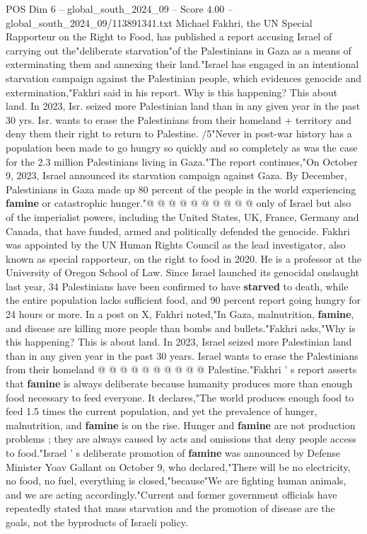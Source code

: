 \begin{textsample}{POS Dim 6 – global\_south\_2024\_09 – Score 4.00 – global\_south\_2024\_09/113891341.txt}  \label{ex:f6_pos_437}
Michael Fakhri, the UN Special Rapporteur on the Right to Food, has published a report accusing Israel of carrying out the"deliberate starvation"of the Palestinians in Gaza as a means of exterminating them and annexing their land."Israel has engaged in an intentional starvation campaign against the Palestinian people, which evidences genocide and extermination,"Fakhri said in his report.
Why is this happening?
This about land.
In 2023, Isr. seized more Palestinian land than in any given year in the past 30 yrs.
Isr. wants to erase the Palestinians from their homeland + territory and deny them their right to return to Palestine. /5"Never in post-war history has a population been made to go hungry so quickly and so completely as was the case for the 2.3 million Palestinians living in Gaza."The report continues,"On October 9, 2023, Israel announced its starvation campaign against Gaza.
By December, Palestinians in Gaza made up 80 percent of the people in the world experiencing \textbf{famine} or catastrophic hunger."@ @ @ @ @ @ @ @ @ @ only of Israel but also of the imperialist powers, including the United States, UK, France, Germany and Canada, that have funded, armed and politically defended the genocide.
Fakhri was appointed by the UN Human Rights Council as the lead investigator, also known as special rapporteur, on the right to food in 2020.
He is a professor at the University of Oregon School of Law.
Since Israel launched its genocidal onslaught last year, 34 Palestinians have been confirmed to have \textbf{starved} to death, while the entire population lacks sufficient food, and 90 percent report going hungry for 24 hours or more.
In a post on X, Fakhri noted,"In Gaza, malnutrition, \textbf{famine}, and disease are killing more people than bombs and bullets."Fakhri asks,"Why is this happening?
This is about land.
In 2023, Israel seized more Palestinian land than in any given year in the past 30 years.
Israel wants to erase the Palestinians from their homeland @ @ @ @ @ @ @ @ @ @ Palestine."Fakhri ' s report asserts that \textbf{famine} is always deliberate because humanity produces more than enough food necessary to feed everyone.
It declares,"The world produces enough food to feed 1.5 times the current population, and yet the prevalence of hunger, malnutrition, and \textbf{famine} is on the rise.
Hunger and \textbf{famine} are not production problems ; they are always caused by acts and omissions that deny people access to food."Israel ' s deliberate promotion of \textbf{famine} was announced by Defense Minister Yoav Gallant on October 9, who declared,"There will be no electricity, no food, no fuel, everything is closed,"because"We are fighting human animals, and we are acting accordingly."Current and former government officials have repeatedly stated that mass starvation and the promotion of disease are the goals, not the byproducts of Israeli policy.

\end{textsample}
